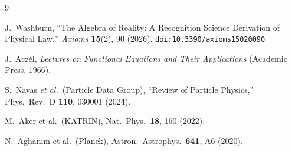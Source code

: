 \documentclass[12pt,a4paper]{article}
\theoremstyle{definition}
\theoremstyle{remark}
\begin{document}
\begin{thebibliography}{9}

J.~Washburn, ``The Algebra of Reality: A Recognition Science Derivation
of Physical Law,'' \emph{Axioms} \textbf{15}(2), 90 (2026).
\texttt{doi:10.3390/axioms15020090}

J.~Acz\'el, \emph{Lectures on Functional Equations and Their
Applications} (Academic Press, 1966).

S.~Navas \textit{et al.}\ (Particle Data Group),
``Review of Particle Physics,'' Phys.\ Rev.\ D \textbf{110}, 030001
(2024).

M.~Aker et al.\ (KATRIN), Nat.\ Phys.\ \textbf{18}, 160 (2022).

N.~Aghanim et al.\ (Planck), Astron.\ Astrophys.\ \textbf{641}, A6 (2020).
\end{thebibliography}
\end{document}
